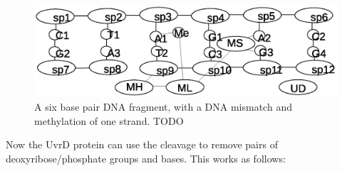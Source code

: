 \documentclass[review]{elsarticle}
\begin{document}
\begin{figure}[h!]
  \centering
    \includegraphics[width=1.0\textwidth]{mmr/state2}
  \caption[A six base pair DNA fragment.]{A six base pair DNA fragment, with a DNA mismatch and methylation of one strand. TODO}
  \label{fig:state2}
\end{figure}

 Now the UvrD protein can use the cleavage to remove pairs of deoxyribose/phosphate groups and bases. This works as follows:
\end{document}
